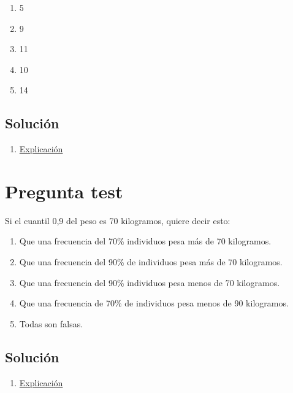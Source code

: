 \documentclass[
]{book}
\providecommand{\tightlist}{%
  \setlength{\itemsep}{0pt}\setlength{\parskip}{0pt}}
\begin{document}
\begin{enumerate}
\def\labelenumi{\alph{enumi})}
\tightlist
\item
  5
\item
  9
\item
  11
\item
  10
\item
  14
\end{enumerate}

\hypertarget{soluciuxf3n-56}{%
\subsection{Solución}\label{soluciuxf3n-56}}

\begin{enumerate}
\def\labelenumi{\alph{enumi})}
\setcounter{enumi}{3}
\tightlist
\item
  \href{https://1fjmanzano.github.io/bioestadistica/medidas-de-posicio\%CC\%81n-dispersio\%CC\%81n-y-forma.html\#medidas-de-posicio\%CC\%81n-centrales}{Explicación}
\end{enumerate}

\hypertarget{pregunta-test-55}{%
\section{Pregunta test}\label{pregunta-test-55}}

Si el cuantil 0,9 del peso es 70 kilogramos, quiere decir esto:

\begin{enumerate}
\def\labelenumi{\alph{enumi})}
\tightlist
\item
  Que una frecuencia del 70\% individuos pesa más de 70 kilogramos.
\item
  Que una frecuencia del 90\% de individuos pesa más de 70 kilogramos.
\item
  Que una frecuencia del 90\% individuos pesa menos de 70 kilogramos.
\item
  Que una frecuencia de 70\% de individuos pesa menos de 90 kilogramos.
\item
  Todas son falsas.
\end{enumerate}

\hypertarget{soluciuxf3n-57}{%
\subsection{Solución}\label{soluciuxf3n-57}}

\begin{enumerate}
\def\labelenumi{\alph{enumi})}
\setcounter{enumi}{2}
\tightlist
\item
  \href{https://1fjmanzano.github.io/bioestadistica/medidas-de-posicio\%CC\%81n-dispersio\%CC\%81n-y-forma.html\#medidas-de-posicio\%CC\%81n-centrales}{Explicación}
\end{enumerate}
\end{document}
